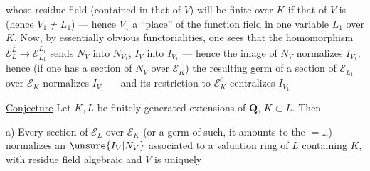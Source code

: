 whose residue field (contained in that of $V$) will be  finite over $K$ if that of $V$ is (hence $V_1\ne L_1$) --- hence $V_1$ \deleted{$\longrightarrow$}  a ``place'' of the function field in one variable $L_1$ over $K$. Now, by essentially obvious functorialities, one sees that the homomorphism $\mathcal E_L^{\overline L}\longrightarrow\mathcal E_{L_1}^{\overline{L_1}}$ sends $N_V$ into $N_{V_1}$, $I_V$ into $I_{V_1}$ --- hence the image of $N_V$ normalizes $I_{V_1}$, hence (if one has a  section of $N_V$ over $\mathcal E_K$) the resulting germ of a section of $\mathcal E_{L_1}$ over $\mathcal E_K$ normalizes $I_{V_1}$ --- and its restriction to $\mathcal E_K^0$ centralizes $I_{V_1}$ ---

\uline{Conjecture} Let $K,L$ be finitely generated extensions of $\mathbf Q$, $K\subset L$. Then

a) Every section of $\mathcal E_L$ over $\mathcal E_K$ (or a germ of such, it amounts to the $=$\ldots) normalizes an $\unsure{I_V|N_V}$ associated to a valuation ring  of $L$ containing $K$, with residue field algebraic  \deleted{\unsure{,}} and  $V$ is uniquely
